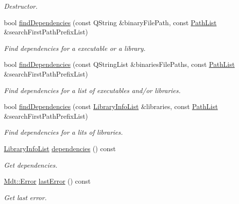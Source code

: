 \begin{DoxyCompactItemize}
\begin{DoxyCompactList}\small\item\em Destructor. \end{DoxyCompactList}\item 
bool \hyperlink{class_mdt_1_1_deploy_utils_1_1_binary_dependencies_ab57081aeb3581d58f5677129ce564013}{find\+Dependencies} (const Q\+String \&binary\+File\+Path, const \hyperlink{class_mdt_1_1_deploy_utils_1_1_path_list}{Path\+List} \&search\+First\+Path\+Prefix\+List)
\begin{DoxyCompactList}\small\item\em Find dependencies for a executable or a library. \end{DoxyCompactList}\item 
bool \hyperlink{class_mdt_1_1_deploy_utils_1_1_binary_dependencies_a6b2116711ce9bbc3b3523eac16af28ec}{find\+Dependencies} (const Q\+String\+List \&binaries\+File\+Paths, const \hyperlink{class_mdt_1_1_deploy_utils_1_1_path_list}{Path\+List} \&search\+First\+Path\+Prefix\+List)
\begin{DoxyCompactList}\small\item\em Find dependencies for a list of executables and/or libraries. \end{DoxyCompactList}\item 
bool \hyperlink{class_mdt_1_1_deploy_utils_1_1_binary_dependencies_a99b12cd9e28d27d33d416a51e116f54e}{find\+Dependencies} (const \hyperlink{class_mdt_1_1_deploy_utils_1_1_library_info_list}{Library\+Info\+List} \&libraries, const \hyperlink{class_mdt_1_1_deploy_utils_1_1_path_list}{Path\+List} \&search\+First\+Path\+Prefix\+List)
\begin{DoxyCompactList}\small\item\em Find dependencies for a lits of libraries. \end{DoxyCompactList}\item 
\hyperlink{class_mdt_1_1_deploy_utils_1_1_library_info_list}{Library\+Info\+List} \hyperlink{class_mdt_1_1_deploy_utils_1_1_binary_dependencies_a53e68f923a4c13493eba8990eaf6b5ef}{dependencies} () const \hypertarget{class_mdt_1_1_deploy_utils_1_1_binary_dependencies_a53e68f923a4c13493eba8990eaf6b5ef}{}\label{class_mdt_1_1_deploy_utils_1_1_binary_dependencies_a53e68f923a4c13493eba8990eaf6b5ef}

\begin{DoxyCompactList}\small\item\em Get dependencies. \end{DoxyCompactList}\item 
\hyperlink{class_mdt_1_1_error}{Mdt\+::\+Error} \hyperlink{class_mdt_1_1_deploy_utils_1_1_binary_dependencies_ada341a03a0f42c02cf0d23f82e21f58e}{last\+Error} () const \hypertarget{class_mdt_1_1_deploy_utils_1_1_binary_dependencies_ada341a03a0f42c02cf0d23f82e21f58e}{}\label{class_mdt_1_1_deploy_utils_1_1_binary_dependencies_ada341a03a0f42c02cf0d23f82e21f58e}

\begin{DoxyCompactList}\small\item\em Get last error. \end{DoxyCompactList}\end{DoxyCompactItemize}


